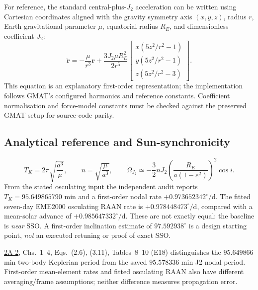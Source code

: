 \documentclass[10pt,a4paper]{article}
\newcommand{\analref}[1]{\href{AtlasSAT_2A-2_Analytical_Derivations_v0.2.1_Public_RC_v0_2.pdf}{2A-2}, #1 (E18)}
\begin{document}
For reference, the standard central-plus-\(J_2\) acceleration can be written using Cartesian coordinates aligned with the gravity symmetry axis \((x,y,z)\), radius \(r\), Earth gravitational parameter \(\mu\), equatorial radius \(R_E\), and dimensionless coefficient \(J_2\):
\begin{equation}
\boldsymbol{\ddot r}=-\frac{\mu}{r^3}\boldsymbol r + \frac{3 J_2\mu R_E^2}{2r^5}\begin{bmatrix}
x(5z^2/r^2-1)\\y(5z^2/r^2-1)\\z(5z^2/r^2-3)
\end{bmatrix}.
\end{equation}
This equation is an explanatory first-order representation; the implementation follows GMAT's configured harmonics and reference constants. Coefficient normalisation and force-model constants must be checked against the preserved GMAT setup for source-code parity.

\subsection{Analytical reference and Sun-synchronicity}
\begin{equation}
T_K=2\pi\sqrt{\frac{a^3}{\mu}},\qquad n=\sqrt{\frac{\mu}{a^3}},\qquad
\dot\Omega_{J_2}\simeq -\frac{3}{2}nJ_2\left(\frac{R_E}{a(1-e^2)}\right)^2\cos i.
\end{equation}
From the stated osculating input the independent audit reports \(T_K=95.649865790\) min and a first-order nodal rate \(+0.973652342^\circ/\mathrm{d}\). The fitted seven-day EME2000 osculating RAAN rate is \(+0.978448473^\circ/\mathrm{d}\), compared with a mean-solar advance of \(+0.985647332^\circ/\mathrm{d}\). These are not exactly equal: the baseline is \emph{near} SSO. A first-order inclination estimate of \(97.592938^\circ\) is a design starting point, \emph{not} an executed retuning or proof of exact SSO.

\analref{Chs.~1--4, Eqs.~(2.6), (3.11), Tables~8--10} distinguishes the \(95.649866\) min two-body Keplerian period from the saved \(95.578336\) min J2 nodal period. First-order mean-element rates and fitted osculating RAAN also have different averaging/frame assumptions; neither difference measures propagation error.
\end{document}
